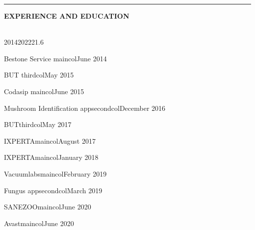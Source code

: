 \documentclass[10pt,A4]{article}
\newcommand{\cvsection}[2] {
\textcolor{sectcol}{\uppercase{\textbf{#1}}}
}
\newcommand{\cvsect}[4]{
	\textcolor{#3}{\hrule}
	\colorbox{#3}{ {\cvsection{#1}{#4}}}
}
\begin{document}
\begin{minipage}{0.4\textwidth}
	\vspace{56pt}
	\cvsect{Experience and Education}{0.4}{thirdcol}{textcol}\\[16pt]
	
	\hspace{60pt}\mbox{  }
	\vspace{-50pt}
	\begin{center}
		
		\begin{cvtimeline}{2014}{2022}{21.6}%
			
			
			
			{Bestone Service}
			{maincol}{June 2014}
			
			{BUT}
			{thirdcol}{May 2015}

			{Codasip}
			{maincol}{June 2015}
			
			{Mushroom Identification app}{secondcol}{December 2016}
			
			{BUT}{thirdcol}{May 2017}
			
			{IXPERTA}{maincol}{August 2017}
			
			{IXPERTA}{maincol}{January 2018}
			    
			{Vacuumlabs}{maincol}{February 2019}    
			
			{Fungus app}{secondcol}{March 2019}
			
			{SANEZOO}{maincol}{June 2020}

			{Avast}{maincol}{June 2020}
			     
		\end{cvtimeline}
	\end{center}
\end{minipage}
\end{document}
